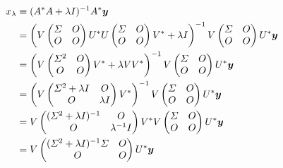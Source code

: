 \begin{align}
    x_{\lambda}
     & \equiv (A^* A + \lambda I)^{-1} A^* \bm{y}
    \notag                                        \\
     & = \left(V
    \begin{pmatrix}
        \varSigma & O \\
        O      & O
    \end{pmatrix}
    U^* U
    \begin{pmatrix}
        \varSigma & O \\
        O      & O
    \end{pmatrix}
    V^* + \lambda I \right)^{-1}
    V
    \begin{pmatrix}
        \varSigma & O \\
        O      & O
    \end{pmatrix}
    U^* \bm{y}
    \notag                                        \\
     & = \left(V
    \begin{pmatrix}
        \varSigma^2 & O \\
        O        & O
    \end{pmatrix}
    V^* + \lambda V V^* \right)^{-1}
    V
    \begin{pmatrix}
        \varSigma & O \\
        O      & O
    \end{pmatrix}
    U^* \bm{y}
    \notag                                        \\
     & = \left(V
    \begin{pmatrix}
        \varSigma^2 + \lambda I & O         \\
        O                    & \lambda I
    \end{pmatrix}
    V^* \right)^{-1}
    V
    \begin{pmatrix}
        \varSigma & O \\
        O      & O
    \end{pmatrix}
    U^* \bm{y}
    \notag                                        \\
     & = V
    \begin{pmatrix}
        (\varSigma^2 + \lambda I)^{-1} & O              \\
        O                           & \lambda^{-1} I
    \end{pmatrix}
    V^*
    V
    \begin{pmatrix}
        \varSigma & O \\
        O      & O
    \end{pmatrix}
    U^* \bm{y}
    \notag                                        \\
     & = V
    \begin{pmatrix}
        (\varSigma^2 + \lambda I)^{-1} \varSigma & O \\
        O                                  & O
    \end{pmatrix}
    U^* \bm{y}
    \label{eq:regularization_tikhonov_solution-by-svd-matrices}
\end{align}

